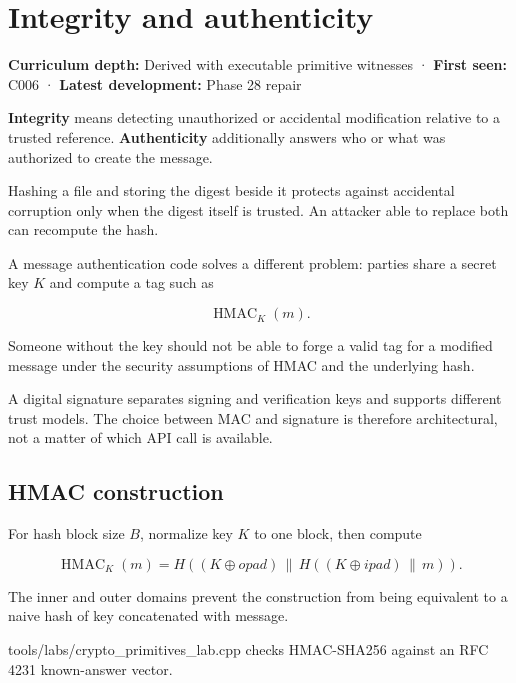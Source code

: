 \hypertarget{appendix-cbe594d1ab0a}{}\label{referencestart:appendix-cbe594d1ab0a}
\section{Integrity and authenticity}\label{appendix-cbe594d1ab0a-integrity-and-authenticity}

\hypertarget{appendix-cbe594d1ab0a-integrity-and-authenticity}{}

\textbf{Curriculum depth:} Derived with executable primitive witnesses · \textbf{First seen:} C006 · \textbf{Latest development:} Phase 28 repair

\textbf{Integrity} means detecting unauthorized or accidental modification relative to a trusted reference. \textbf{Authenticity} additionally answers who or what was authorized to create the message.

Hashing a file and storing the digest beside it protects against accidental corruption only when the digest itself is trusted. An attacker able to replace both can recompute the hash.

A message authentication code solves a different problem: parties share a secret key \(K\) and compute a tag such as

\[
\operatorname{HMAC}_K(m).
\]

Someone without the key should not be able to forge a valid tag for a modified message under the security assumptions of HMAC and the underlying hash.

A digital signature separates signing and verification keys and supports different trust models. The choice between MAC and signature is therefore architectural, not a matter of which API call is available.

\subsection{HMAC construction}\label{appendix-cbe594d1ab0a-hmac-construction}

\hypertarget{appendix-cbe594d1ab0a-hmac-construction}{}

For hash block size \(B\), normalize key \(K\) to one block, then compute

\[
\operatorname{HMAC}_K(m)
=
H((K\oplus opad)\,\|\,
  H((K\oplus ipad)\,\|\,m)).
\]

The inner and outer domains prevent the construction from being equivalent to a naive hash of key concatenated with message.

tools/labs/crypto\_primitives\_lab.cpp checks HMAC-SHA256 against an RFC 4231 known-answer vector.

